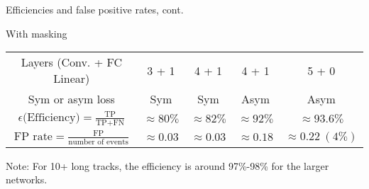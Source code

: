 \begin{frame}{Efficiencies and false positive rates, cont.}
\begin{table}[]
\centering
    {\Large With masking} \\
    \vspace{.5em}
\begin{tabular}{ccccc}
    Layers (Conv. + FC Linear) & 3 + 1 & 4 + 1 & 4 + 1  & 5 + 0\\[.3em]
    Sym or asym loss      & Sym          & Sym             & Asym & Asym     \\ [0.9em]
    $ \epsilon \textrm{(Efficiency)} = \frac{\mbox{TP}}{\mbox{TP} + \mbox{FN}} $ &  $ \approx 80\% $  & $ \approx 82\% $ & $ \approx 92\% $ & $ \approx 93.6\% $ \\ [0.9em]
    $ \textrm{FP rate} = \frac{\mbox{FP}}{\mbox{number of events}} $ &  $\approx 0.03  $  & $\approx 0.03  $ & $ \approx 0.18 $ & $ \approx 0.22\ (4\%) $ \\
 \end{tabular}
\end{table}

Note: For 10+ long tracks, the efficiency is around 97\%-98\% for the larger networks.
\end{frame}
